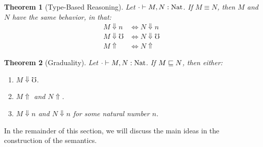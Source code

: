 \documentclass{article}
\newtheorem{theorem}{Theorem}[section]
\theoremstyle{definition}
\theoremstyle{remark}
\begin{document}
\begin{theorem}[Type-Based Reasoning]
    Let $\cdot \vdash M, N : \text{Nat}$. If $M \equiv N$, then $M$ and $N$ have the
    same behavior, in that:
    \begin{align*}
        M \Downarrow n &\iff N \Downarrow n \\
        M \Downarrow \mho &\iff N \Downarrow \mho \\
        M \Uparrow &\iff N \Uparrow
    \end{align*}
\end{theorem}

\begin{theorem}[Graduality]
    Let $\cdot \vdash M, N : \text{Nat}$. If $M \sqsubseteq N$, then either:
    \begin{enumerate}
        \item $M \Downarrow \mho$.
        \item $M \Uparrow$ and $N \Uparrow$.
        \item $M \Downarrow n$ and $N \Downarrow n$ for some natural number $n$.
    \end{enumerate}
\end{theorem}





In the remainder of this section, we will discuss the main ideas in the
construction of the semantics.

\end{document}
